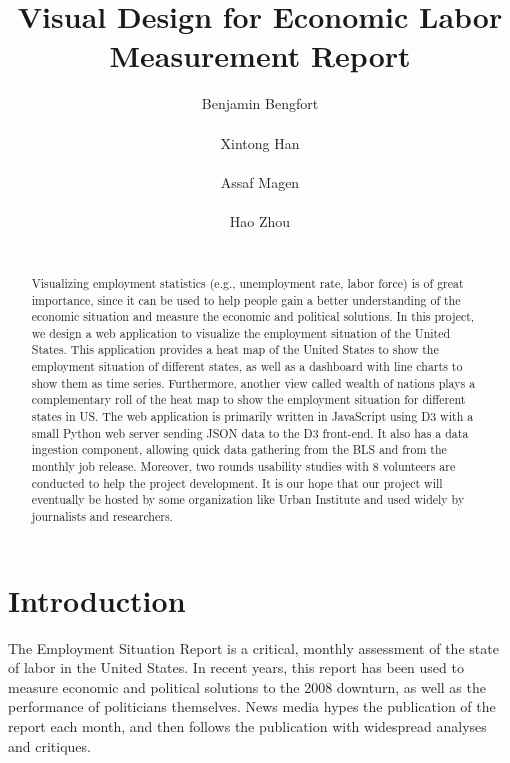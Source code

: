 \documentclass{sigchi}
\begin{document}
\title{Visual Design for Economic Labor Measurement Report}

\author{
  \alignauthor Benjamin Bengfort\\
    \\
  \alignauthor Xintong Han\\
    \\
  \alignauthor Assaf Magen\\
    \\
  \alignauthor Hao Zhou\\
    \\
}

\maketitle

\begin{abstract}
Visualizing employment statistics (e.g., unemployment rate, labor force) is of great importance, since it can be used to help people gain a better understanding of  the economic situation and measure the economic and political solutions. In this project, we design a web application to visualize the employment situation of the United States. This application provides a heat map of the United States to show the employment situation of different states, as well as a dashboard with line charts to show them as time series. Furthermore, another view called wealth of nations plays a complementary roll of the heat map to show the employment situation for different states in US. The web application is primarily written in JavaScript using D3 with a small Python web server sending JSON data to the D3 front-end. It also has a data ingestion component, allowing quick data gathering from the BLS and from the monthly job release. Moreover, two rounds usability studies with 8 volunteers are conducted to help the project development. It is our hope that our project will eventually be hosted by some organization like Urban Institute and used widely by journalists and researchers.
\end{abstract}



\section{Introduction}
The Employment Situation Report is a critical, monthly assessment of the state of labor in the United States. In recent years, this report has been used to measure economic and political solutions to the 2008 downturn, as well as the performance of politicians themselves. News media hypes the publication of the report each month, and then follows the publication with widespread analyses and critiques.
\end{document}

